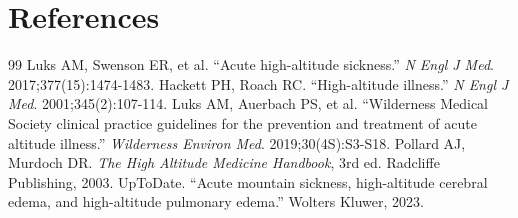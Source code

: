 \section*{References}
\begin{thebibliography}{99}
 Luks AM, Swenson ER, et al. ``Acute high-altitude sickness.'' \textit{N Engl J Med}. 2017;377(15):1474-1483.
 Hackett PH, Roach RC. ``High-altitude illness.'' \textit{N Engl J Med}. 2001;345(2):107-114.
 Luks AM, Auerbach PS, et al. ``Wilderness Medical Society clinical practice guidelines for the prevention and treatment of acute altitude illness.'' \textit{Wilderness Environ Med}. 2019;30(4S):S3-S18.
 Pollard AJ, Murdoch DR. \textit{The High Altitude Medicine Handbook}, 3rd ed. Radcliffe Publishing, 2003.
 UpToDate. ``Acute mountain sickness, high-altitude cerebral edema, and high-altitude pulmonary edema.'' Wolters Kluwer, 2023.
\end{thebibliography}
